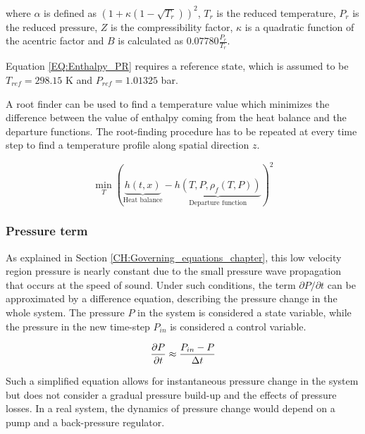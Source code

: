 \documentclass[a4paper,fleqn]{cas-dc}
\begin{document}
	where $\alpha$ is defined as $\left( 1+\kappa \left( 1 - \sqrt{T_r} \right) \right)^2$, $T_r$ is the reduced temperature, $P_r$ is the reduced pressure, $Z$ is the compressibility factor, $\kappa$ is a quadratic function of the acentric factor and $B$ is calculated as $0.07780\frac{P_r}{T_r}$.
	
	Equation \ref{EQ:Enthalpy_PR} requires a reference state, which is assumed to be $T_{ref}=298.15$ K and $P_{ref}=1.01325$ bar.
	
	A root finder can be used to find a temperature value which minimizes the difference between the value of enthalpy coming from the heat balance and the departure functions. The root-finding procedure has to be repeated at every time step to find a temperature profile along spatial direction $z$.
	
	{\footnotesize
		\begin{equation}
			\min_T \left( \underbrace{h\left(t,x\right)}_{\text{Heat balance}} - \underbrace{h\left(T,P,\rho_f\left(T,P\right)\right)}_{\text{Departure function}} \right)^2
			\label{EQ:Enthalpy_root}
		\end{equation}
	}
	
	\subsubsection{Pressure term} \label{CH: Pressure}
	
	As explained in Section \ref{CH:Governing_equations_chapter}, this low velocity region pressure is nearly constant due to the small pressure wave propagation that occurs at the speed of sound. Under such conditions, the term $\partial P/\partial t$ can be approximated by a difference equation, {\color{blue}describing} the pressure change in the whole system. The pressure $P$ in the system is considered a state variable, while the pressure in the new time-step $P_{in}$ is considered a control variable.
	
	{\footnotesize
		\begin{equation}
			\frac{\partial {\color{black}P}}{\partial t} \approx \frac{{\color{black}P_{in}} - {\color{black}P} }{\Delta t}
	\end{equation}}
	
	Such a simplified equation allows for instantaneous pressure change in the system but does not consider a gradual pressure build-up and the effects of pressure losses. In a real system, the dynamics of pressure change would depend on a pump and a back-pressure regulator.
	
\end{document}
